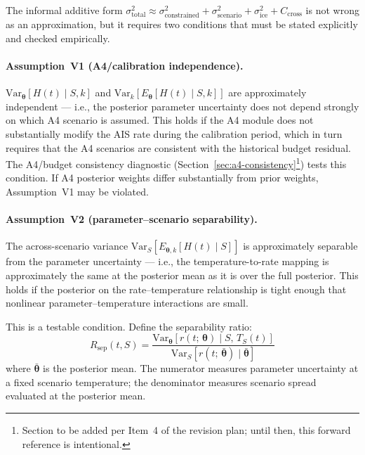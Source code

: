 \documentclass[11pt]{article}
\begin{document}
The informal additive form $\sigma_{\text{total}}^2 \approx \sigma_{\text{constrained}}^2 + \sigma_{\text{scenario}}^2 + \sigma_{\text{ice}}^2 + C_{\text{cross}}$ is not wrong as an approximation, but it requires two conditions that must be stated explicitly and checked empirically.

\paragraph{Assumption~V1 (A4/calibration independence).}
$\text{Var}_{\boldsymbol{\theta}}[H(t) \mid S, k]$ and $\text{Var}_k[E_{\boldsymbol{\theta}}[H(t) \mid S, k]]$ are approximately independent --- i.e., the posterior parameter uncertainty does not depend strongly on which A4 scenario is assumed.  This holds if the A4 module does not substantially modify the AIS rate during the calibration period, which in turn requires that the A4 scenarios are consistent with the historical budget residual.  The A4/budget consistency diagnostic (Section~\ref{sec:a4-consistency}\footnote{Section to be added per Item~4 of the revision plan; until then, this forward reference is intentional.}) tests this condition.  If A4 posterior weights differ substantially from prior weights, Assumption~V1 may be violated.

\paragraph{Assumption~V2 (parameter--scenario separability).}
The across-scenario variance $\text{Var}_S[E_{\boldsymbol{\theta},k}[H(t) \mid S]]$ is approximately separable from the parameter uncertainty --- i.e., the temperature-to-rate mapping is approximately the same at the posterior mean as it is over the full posterior.  This holds if the posterior on the rate--temperature relationship is tight enough that nonlinear parameter--temperature interactions are small.

This is a testable condition.  Define the separability ratio:
\begin{equation}
  R_{\text{sep}}(t, S) = \frac{\text{Var}_{\boldsymbol{\theta}}[r(t;\, \boldsymbol{\theta}) \mid S,\, T_S(t)]}
    {\text{Var}_S[r(t;\, \bar{\boldsymbol{\theta}}) \mid \bar{\boldsymbol{\theta}}]}
  \label{eq:Rsep}
\end{equation}
where $\bar{\boldsymbol{\theta}}$ is the posterior mean.  The numerator measures parameter uncertainty at a fixed scenario temperature; the denominator measures scenario spread evaluated at the posterior mean.
\end{document}
